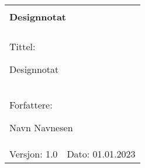 \begin{minipage}[c]{0.15\textwidth}
\end{minipage}
\begin{minipage}[c]{0.85\textwidth}

\renewcommand{\arraystretch}{1.7}
\large 
\begin{tabularx}{\textwidth}{|X|X|}
\hline
\multicolumn{2}{|l|}{} \\
\multicolumn{2}{|l|}{\huge \textbf{Designnotat}} \\
\multicolumn{2}{|l|}{}  \\
\hline
\multicolumn{2}{|l|}{Tittel: 

Designnotat
} \\
\hline
\multicolumn{2}{|l|}{Forfattere: 

Navn Navnesen
} \\
\hline

Versjon: 1.0 & Dato: 01.01.2023
\\
\hline 
\end{tabularx}
\end{minipage}
\normalsize
